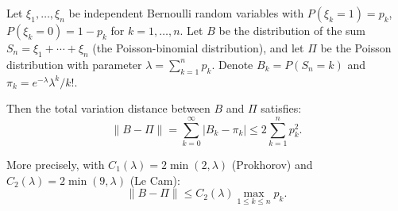 Let $\xi_1, \ldots, \xi_n$ be independent Bernoulli random variables with $P(\xi_k = 1) = p_k$, $P(\xi_k = 0) = 1 - p_k$ for $k = 1, \ldots, n$. Let $B$ be the distribution of the sum $S_n = \xi_1 + \cdots + \xi_n$ (the Poisson-binomial distribution), and let $\Pi$ be the Poisson distribution with parameter $\lambda = \sum_{k=1}^n p_k$. Denote $B_k = P(S_n = k)$ and $\pi_k = e^{-\lambda} \lambda^k/k!$.

Then the total variation distance between $B$ and $\Pi$ satisfies:
$$\|B - \Pi\| = \sum_{k=0}^{\infty} |B_k - \pi_k| \leq 2 \sum_{k=1}^{n} p_k^2.$$

More precisely, with $C_1(\lambda) = 2\min(2, \lambda)$ (Prokhorov) and $C_2(\lambda) = 2\min(9, \lambda)$ (Le Cam):
$$\|B - \Pi\| \leq C_2(\lambda) \max_{1 \leq k \leq n} p_k.$$
